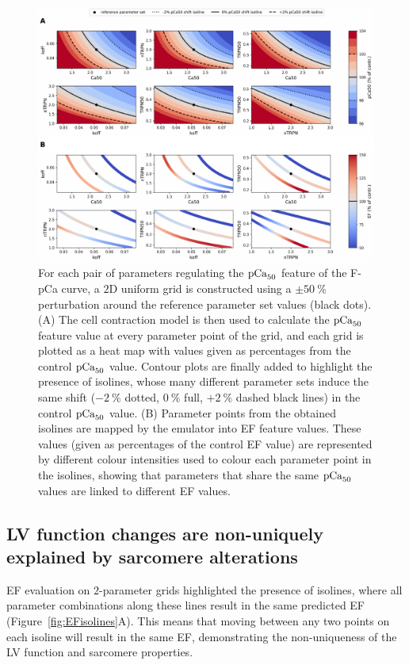 \begin{figure}[h!]
    \myfloatalign
    \includegraphics[width=\textwidth]{figures/chapter08/Fig5.pdf}
    \caption{For each pair of parameters regulating the $\textrm{pCa}_{50}$ feature of the F-pCa curve, a $2$D uniform grid is constructed using a $\pm\SI{50}{\percent}$ perturbation around the reference parameter set values (black dots). (A) The cell contraction model is then used to calculate the $\textrm{pCa}_{50}$ feature value at every parameter point of the grid, and each grid is plotted as a heat map with values given as percentages from the control $\textrm{pCa}_{50}$ value. Contour plots are finally added to highlight the presence of isolines, whose many different parameter sets induce the same shift ($-\SI{2}{\percent}$ dotted, $\SI{0}{\percent}$ full, $+\SI{2}{\percent}$ dashed black lines) in the control $\textrm{pCa}_{50}$ value. (B) Parameter points from the obtained isolines are mapped by the emulator into EF feature values. These values (given as percentages of the control EF value) are represented by different colour intensities used to colour each parameter point in the isolines, showing that parameters that share the same $\textrm{pCa}_{50}$ values are linked to different EF values.}
    \label{fig:pca50isolines}
\end{figure}


%
%
%
\subsection{LV function changes are non-uniquely explained by sarcomere alterations}\label{sec:changesLVfunctionresult}
EF evaluation on $2$-parameter grids highlighted the presence of isolines, where all parameter combinations along these lines result in the same predicted EF (Figure~\ref{fig:EFisolines}A). This means that moving between any two points on each isoline will result in the same EF, demonstrating the non-uniqueness of the LV function and sarcomere properties.



